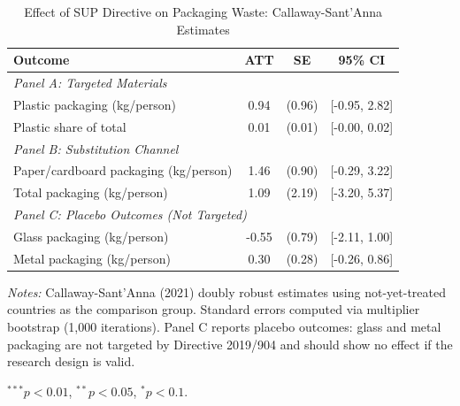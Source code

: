 \begin{table}[t]
\centering
\caption{Effect of SUP Directive on Packaging Waste: Callaway-Sant'Anna Estimates}
\label{tab:main_results}
\begin{tabular}{lccc}
\toprule
  Outcome & ATT & SE & 95\% CI \\
\midrule
\multicolumn{4}{l}{\textit{Panel A: Targeted Materials}} \\[3pt]
  Plastic packaging (kg/person) & 0.94 & (0.96) & [-0.95, 2.82] \\
  Plastic share of total & 0.01 & (0.01) & [-0.00, 0.02] \\
\midrule
\multicolumn{4}{l}{\textit{Panel B: Substitution Channel}} \\[3pt]
  Paper/cardboard packaging (kg/person) & 1.46 & (0.90) & [-0.29, 3.22] \\
  Total packaging (kg/person) & 1.09 & (2.19) & [-3.20, 5.37] \\
\midrule
\multicolumn{4}{l}{\textit{Panel C: Placebo Outcomes (Not Targeted)}} \\[3pt]
  Glass packaging (kg/person) & -0.55 & (0.79) & [-2.11, 1.00] \\
  Metal packaging (kg/person) & 0.30 & (0.28) & [-0.26, 0.86] \\
\bottomrule
\end{tabular}
\begin{tablenotes}[flushleft]
\small
\item \textit{Notes:} Callaway-Sant'Anna (2021) doubly robust estimates using not-yet-treated countries as the comparison group. Standard errors computed via multiplier bootstrap (1,000 iterations). Panel C reports placebo outcomes: glass and metal packaging are not targeted by Directive 2019/904 and should show no effect if the research design is valid.
\item $^{***}p<0.01$, $^{**}p<0.05$, $^{*}p<0.1$.
\end{tablenotes}
\end{table}
